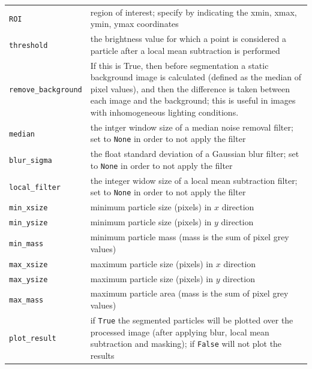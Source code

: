 \documentclass[10pt,a4paper]{article}
\begin{document}
\begin{table}[!ht]
\begin{tabular}{l m{10cm}}
		
		\texttt{ROI} & region of interest; specify by indicating the xmin, xmax, ymin, ymax coordinates \\[.3em]
		
		\texttt{threshold} & the brightness value for which a point is considered a particle after a local mean subtraction is performed \\[.5em]
		
		\texttt{remove\_background} & If this is True, then before segmentation a static background image is calculated (defined as the median of pixel values), and then the difference is taken between each image and the background; this is useful in images with inhomogeneous lighting conditions. \\[.5em]
		
		\texttt{median} & the intger window size of a median noise removal filter; set to \texttt{None} in order to not apply the filter \\[.3em]
		
		\texttt{blur\_sigma} & the float standard deviation of a Gaussian blur filter; set to \texttt{None} in order to not apply the filter \\[.3em]
		
		\texttt{local\_filter} & the integer widow size of a local mean subtraction filter; set to \texttt{None} in order to not apply the filter \\[.3em]
		
		\texttt{min\_xsize} & minimum particle size (pixels) in $x$ direction \\[.3em]
		
		\texttt{min\_ysize} & minimum particle size (pixels) in $y$ direction \\[.3em]
		
		\texttt{min\_mass} & minimum particle mass (mass is the sum of pixel grey values)\\[.3em]
		
		\texttt{max\_xsize} & maximum particle size (pixels) in $x$ direction \\[.3em]
		
		\texttt{max\_ysize} & maximum particle size (pixels) in $y$ direction \\[.3em]
		
		\texttt{max\_mass} & maximum particle area (mass is the sum of pixel grey values) \\[.3em]
		
		\texttt{plot\_result} & if \texttt{True} the segmented particles will be plotted over the processed image (after applying blur, local mean subtraction and masking); if \texttt{False} will not plot the results \\[.3em]
		

\end{tabular}
\end{table}
\end{document}

